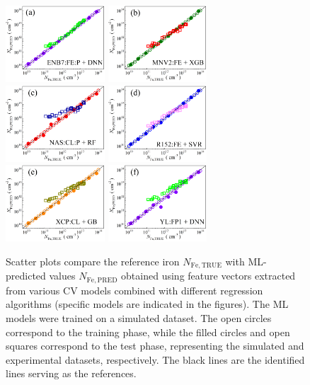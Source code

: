 \documentclass[10pt]{iopart}
\begin{document}
\begin{figure}
\includegraphics[width=0.33\textwidth]{Fig4a}
\includegraphics[width=0.33\textwidth]{Fig4b}
\includegraphics[width=0.33\textwidth]{Fig4c}
\includegraphics[width=0.33\textwidth]{Fig4d}
\includegraphics[width=0.33\textwidth]{Fig4e}
\includegraphics[width=0.33\textwidth]{Fig4f}
\caption{
Scatter plots compare the reference iron $N_\mathrm{Fe,TRUE}$ with ML-predicted values $N_\mathrm{Fe,PRED}$ 
obtained using feature vectors extracted from various CV models combined with different regression algorithms
(specific models are indicated in the figures). 
The ML models were trained on a simulated dataset. 
The open circles correspond to the training phase, 
while the filled circles and open squares correspond to the test phase, representing the simulated and experimental datasets, respectively. 
The black lines are the identified lines serving as the references.
}\label{Fig4}
\end{figure}
\end{document}
